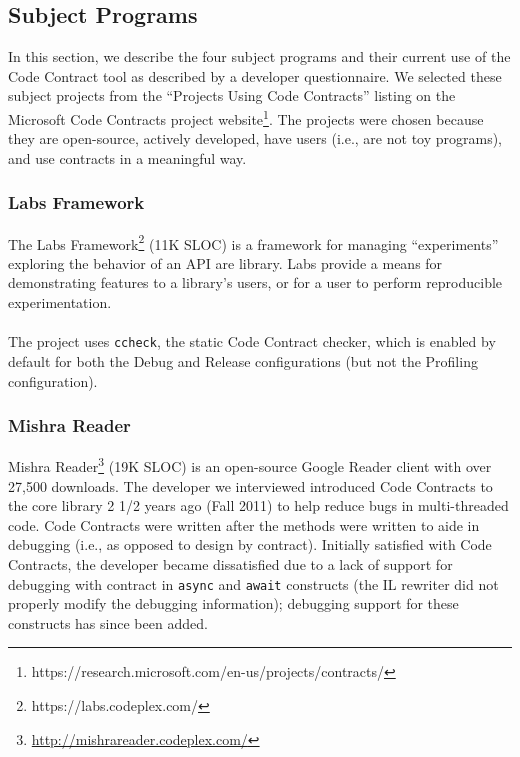 \subsection{Subject Programs}
\label{sec:subject-programs}

In this section, we describe the four subject programs and their
current use of the Code Contract tool as described by a developer
questionnaire. We selected these subject projects from the ``Projects
Using Code Contracts'' listing on the Microsoft Code Contracts
project
website\footnote{https://research.microsoft.com/en-us/projects/contracts/}.
%
The projects were chosen because they are open-source, actively
developed, have users (i.e., are not toy programs), and use contracts
in a meaningful way.

\subsubsection{Labs Framework}

The Labs Framework\footnote{https://labs.codeplex.com/} (11K SLOC) is
a framework for managing ``experiments'' exploring the behavior of an
API are library. Labs provide a means for demonstrating features to a
library's users, or for a user to perform reproducible
experimentation.
\\ \\
The project uses \verb|ccheck|, the static Code Contract checker,
which is enabled by default for both the Debug and Release
configurations (but not the Profiling configuration).

\subsubsection{Mishra Reader}

Mishra Reader\footnote{\url{http://mishrareader.codeplex.com/}}
(19K SLOC) is an open-source Google Reader client with over 27,500
downloads.
%
The developer we interviewed introduced Code Contracts to the core
library 2 1/2 years ago (Fall 2011) to help reduce bugs in
multi-threaded code.
%
Code Contracts were written after the methods were written to aide in
debugging (i.e., as opposed to design by contract).
%
Initially satisfied with Code Contracts, the developer became
dissatisfied due to a lack of support for debugging with contract in
\verb|async| and \verb|await| constructs (the IL rewriter did not
properly modify the debugging information); debugging support for
these constructs has since been added.

